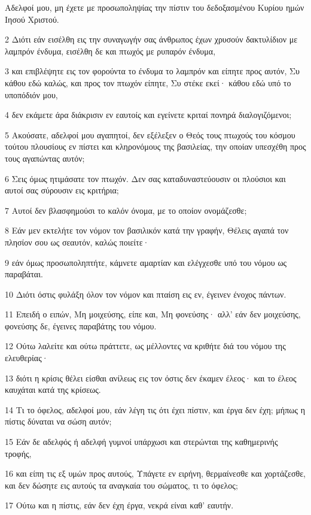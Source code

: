 \par Αδελφοί μου, μη έχετε με προσωποληψίας την πίστιν του δεδοξασμένου Κυρίου ημών Ιησού Χριστού.
\par 2 Διότι εάν εισέλθη εις την συναγωγήν σας άνθρωπος έχων χρυσούν δακτυλίδιον με λαμπρόν ένδυμα, εισέλθη δε και πτωχός με ρυπαρόν ένδυμα,
\par 3 και επιβλέψητε εις τον φορούντα το ένδυμα το λαμπρόν και είπητε προς αυτόν, Συ κάθου εδώ καλώς, και προς τον πτωχόν είπητε, Συ στέκε εκεί· κάθου εδώ υπό το υποπόδιόν μου,
\par 4 δεν εκάμετε άρα διάκρισιν εν εαυτοίς και εγείνετε κριταί πονηρά διαλογιζόμενοι;
\par 5 Ακούσατε, αδελφοί μου αγαπητοί, δεν εξέλεξεν ο Θεός τους πτωχούς του κόσμου τούτου πλουσίους εν πίστει και κληρονόμους της βασιλείας, την οποίαν υπεσχέθη προς τους αγαπώντας αυτόν;
\par 6 Σεις όμως ητιμάσατε τον πτωχόν. Δεν σας καταδυναστεύουσιν οι πλούσιοι και αυτοί σας σύρουσιν εις κριτήρια;
\par 7 Αυτοί δεν βλασφημούσι το καλόν όνομα, με το οποίον ονομάζεσθε;
\par 8 Εάν μεν εκτελήτε τον νόμον τον βασιλικόν κατά την γραφήν, Θέλεις αγαπά τον πλησίον σου ως σεαυτόν, καλώς ποιείτε·
\par 9 εάν όμως προσωποληπτήτε, κάμνετε αμαρτίαν και ελέγχεσθε υπό του νόμου ως παραβάται.
\par 10 Διότι όστις φυλάξη όλον τον νόμον και πταίση εις εν, έγεινεν ένοχος πάντων.
\par 11 Επειδή ο ειπών, Μη μοιχεύσης, είπε και, Μη φονεύσης· αλλ' εάν δεν μοιχεύσης, φονεύσης δε, έγεινες παραβάτης του νόμου.
\par 12 Ούτω λαλείτε και ούτω πράττετε, ως μέλλοντες να κριθήτε διά του νόμου της ελευθερίας·
\par 13 διότι η κρίσις θέλει είσθαι ανίλεως εις τον όστις δεν έκαμεν έλεος· και το έλεος καυχάται κατά της κρίσεως.
\par 14 Τι το όφελος, αδελφοί μου, εάν λέγη τις ότι έχει πίστιν, και έργα δεν έχη; μήπως η πίστις δύναται να σώση αυτόν;
\par 15 Εάν δε αδελφός ή αδελφή γυμνοί υπάρχωσι και στερώνται της καθημερινής τροφής,
\par 16 και είπη τις εξ υμών προς αυτούς, Υπάγετε εν ειρήνη, θερμαίνεσθε και χορτάζεσθε, και δεν δώσητε εις αυτούς τα αναγκαία του σώματος, τι το όφελος;
\par 17 Ούτω και η πίστις, εάν δεν έχη έργα, νεκρά είναι καθ' εαυτήν.
